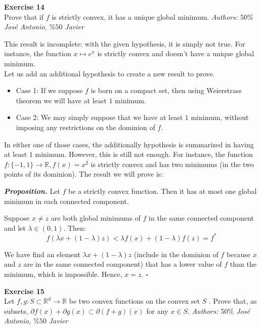 \documentclass[11pt,table]{article}
\newcommand{\qed}{\hfill $\square$}
\newenvironment{problem}[2][Exercise]
{ \begin{mdframed}[backgroundcolor=gray!20] \textbf{#1 #2} \\}
	{\hspace{0.0cm}\newline\newline \emph{Authors: \(50\%\) José Antonio, \(\%50\) Javier}  \end{mdframed}}
\newcommand\R{\mathbb R}
\begin{document}
\begin{problem}{14}
Prove that if \( f \)  is strictly convex, it has a unique global minimum.
\end{problem}

This result is incomplete: with the given hypothesis, it is simply not true. For instance, the function $x \mapsto e^x$ is strictly convex and doesn't have a unique global minimum. \\

Let us add an additional hypothesis to create a new result to prove.

\begin{itemize}
	\item Case 1: If we suppose $f$ is born on a compact set, then using Weierstrass theorem we will have at least $1$ minimum.
	\item Case 2: We may simply suppose that we have at least $1$ minimum, without imposing any restrictions on the dominion of $f$.
\end{itemize}

In either one of those cases, the additionally hypothesis is summarized in having at least $1$ minimum. However, this is still not enough. For instance, the function $f:\{-1,1\} \rightarrow \R, f(x) = x^2$ is strictly convex and has two minimums (in the two points of its dominion). The result we will prove is:

\emph{\textbf{Proposition.}} Let \( f \) be a strictly convex function. Then  it has at most one global minimum in each connected component.

Suppose $x \neq z$ are both global minimums of $f$ in the same connected component and let $\lambda \in (0,1)$. Then:
\[
	f(\lambda x + (1-\lambda)z) < \lambda f(x) + (1-\lambda) f(z) = f^*
\]

We have find an element $\lambda x + (1-\lambda)z$ (include in the dominion of $f$ because $x$ and $z$ are in the same connected component) that has a lower value of $f$ than the minimum, which is impossible. Hence, $x = z$. \qed \\

\begin{problem}{15}
Let \( f,g: S \subset \mathbb{R}^d \to \mathbb{R} \)  be two convex functions on the convex set \( S \) . Prove that, as subsets, \(  \partial f(x) + \partial g(x) \subset \partial(f+g)(x) \) for any $x\in S$.
\end{problem}
\end{document}
